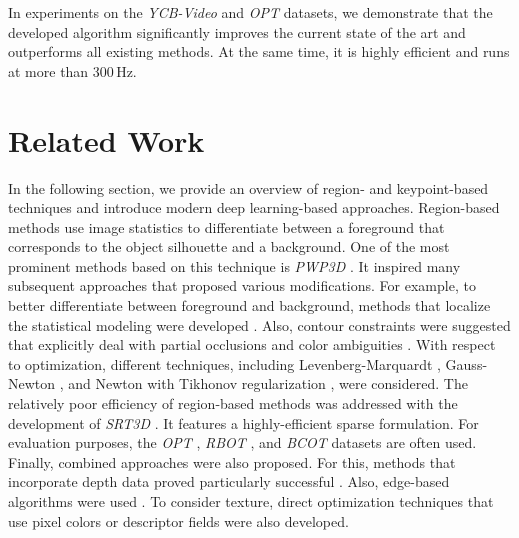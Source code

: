 \documentclass[letterpaper, 10 pt, conference]{ieeeconf}
\begin{document}
In experiments on the \textit{YCB-Video} \cite{Xiang2018} and \textit{OPT} \cite{Wu2017} datasets, we demonstrate that the developed algorithm significantly improves the current state of the art and outperforms all existing methods.
At the same time, it is highly efficient and runs at more than 300\,Hz.




 


\section{Related Work}\label{sec:r}

In the following section, we provide an overview of region- and keypoint-based techniques and introduce modern deep learning-based approaches.
Region-based methods use image statistics to differentiate between a foreground that corresponds to the object silhouette and a background.
One of the most prominent methods based on this technique is \textit{PWP3D} \cite{Prisacariu2012}.
It inspired many subsequent approaches that proposed various modifications.
For example, to better differentiate between foreground and background, methods that localize the statistical modeling were developed \cite{Hexner2016, Tjaden2018, Zhong2020}.
Also, contour constraints were suggested that explicitly deal with partial occlusions and color ambiguities \cite{Huang2021}.
With respect to optimization, different techniques, including Levenberg-Marquardt \cite{Prisacariu2015}, Gauss-Newton \cite{Tjaden2018}, and Newton with Tikhonov regularization \cite{Stoiber2020b}, were considered.
The relatively poor efficiency of region-based methods was addressed with the development of \textit{SRT3D} \cite{Stoiber2020b, Stoiber2021}.
It features a highly-efficient sparse formulation.
For evaluation purposes, the \textit{OPT} \cite{Wu2017}, \textit{RBOT} \cite{Tjaden2018}, and \textit{BCOT} \cite{Li2022} datasets are often used.
Finally, combined approaches were also proposed.
For this, methods that incorporate depth data proved particularly successful \cite{Kehl2017, Ren2017, Stoiber2022}.
Also, edge-based algorithms were used \cite{Li2021, Sun2021}.
To consider texture, direct optimization techniques that use pixel colors \cite{Liu2020} or descriptor fields \cite{Zhong2019} were also developed.
\end{document}
